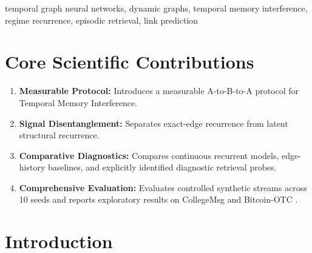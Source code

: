 \documentclass[conference]{IEEEtran}
\begin{document}
\begin{IEEEkeywords}
temporal graph neural networks, dynamic graphs, temporal memory interference, regime recurrence, episodic retrieval, link prediction
\end{IEEEkeywords}

\section*{Core Scientific Contributions}
\begin{enumerate}
    \item \textbf{Measurable Protocol:} Introduces a measurable A-to-B-to-A protocol for Temporal Memory Interference.
    \item \textbf{Signal Disentanglement:} Separates exact-edge recurrence from latent structural recurrence.
    \item \textbf{Comparative Diagnostics:} Compares continuous recurrent models, edge-history baselines, and explicitly identified diagnostic retrieval probes.
    \item \textbf{Comprehensive Evaluation:} Evaluates controlled synthetic streams across 10 seeds and reports exploratory results on CollegeMsg and Bitcoin-OTC \cite{panzarasa2009patterns, kumar2016edge, holland1983stochastic, chen2025towards, huang2025benchmarking}.
\end{enumerate}

\section{Introduction}
\end{document}
